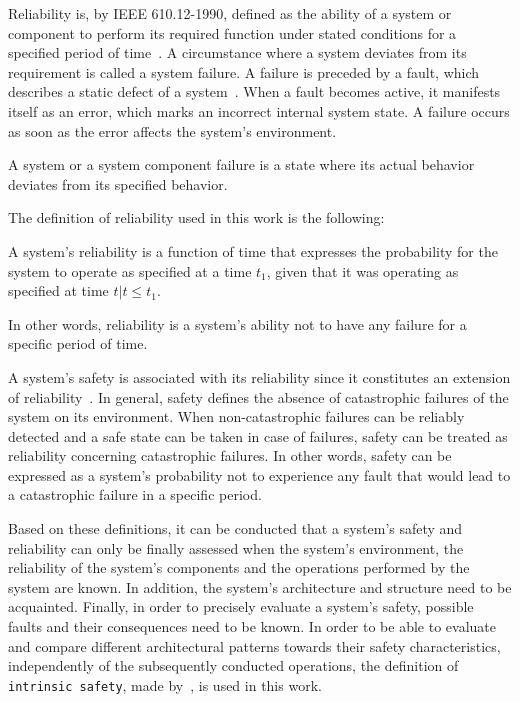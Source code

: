 Reliability is, by IEEE 610.12-1990, defined as the ability of a system or component to perform its required function under stated conditions for a specified period of time~\cite{ieee610.12}.
A circumstance where a system deviates from its requirement is called a system failure.
A failure is preceded by a fault, which describes a static defect of a system~\cite{AmmannOffutt2016}.
When a fault becomes active, it manifests itself as an error, which marks an incorrect internal system state.
A failure occurs as soon as the error affects the system's environment.

\begin{definition}
A system or a system component failure is a state where its actual behavior deviates from its specified behavior.
\end{definition}

The definition of reliability used in this work is the following:

\begin{definition}
\label{def:reliability}
A system's reliability is a function of time that expresses the probability for the system to operate as specified at a time $t_1$, given that it was operating as specified at time $t | t \leq t_1$.
\end{definition}

In other words, reliability is a system's ability not to have any failure for a specific period of time.

A system's safety is associated with its reliability since it constitutes an extension of reliability~\cite{AvizienisDependability2001}.
In general, safety defines the absence of catastrophic failures of the system on its environment.
When non-catastrophic failures can be reliably detected and a safe state can be taken in case of failures, safety can be treated as reliability concerning catastrophic failures.
In other words, safety can be expressed as a system's probability not to experience any fault that would lead to a catastrophic failure in a specific period.

Based on these definitions, it can be conducted that a system's safety and reliability can only be finally assessed when the system's environment, the reliability of the system's components and the operations performed by the system are known.
In addition, the system's architecture and structure need to be acquainted.
Finally, in order to precisely evaluate a system's safety, possible faults and their consequences need to be known.
In order to be able to evaluate and compare different architectural patterns towards their safety characteristics, independently of the subsequently conducted operations, the definition of \texttt{intrinsic safety}, made by~\cite{BoulangerStandards}, is used in this work.

